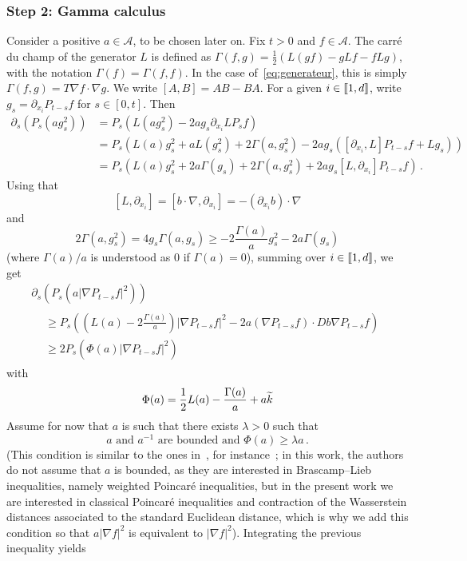 \documentclass[AHL,Unicode,longabstracts,published]{cedram}
\newcommand{\llbracket}{\mathopen{[\mkern -2.7mu[}}
\newcommand{\rrbracket}{\mathclose{]\mkern -2.7mu]}}
\newcommand{\A}{\mathcal A}
\newcommand{\na}{\nabla}
\newcommand{\1}{\mathbbm{1}}
\newcommand{\nv}[1]{#1}
\let\oldtilde\tilde
\renewcommand*{\tilde}[1]{\mathchoice{\widetilde{#1}}{\widetilde{#1}}{\oldtilde{#1}}{\oldtilde{#1}}}
\begin{document}
\subsubsection{Step 2: Gamma calculus}


Consider a positive $a\in\A$, to be chosen later on. Fix $t>0$ and $f\in\A$. The carré du champ of the generator $L$ is defined as $\Gamma(f,g) = \frac12 ( L(gf) - g Lf-fLg)$, with the notation $\Gamma(f)=\Gamma(f,f)$. In the case of~\eqref{eq:generateur}, this is simply $\Gamma(f,g)=T\na f\cdot\na g$. We write $[A,B]=AB-BA$. For a given $i\in\llbracket 1,d\rrbracket$, write $g_s = \partial_{x_i} P_{t-s} f$ for $s\in[0,t]$. Then
\begin{align*}
\partial_s \left( P_s(a g_s^2)\right) &= P_{s} \left( L(ag_s^2) - 2a g_s \partial_{x_i} LP_s f \right) \\
&= P_{s} \left( L(a)g_s^2 + aL(g_s^2) + 2 \Gamma(a,g_s^2)- 2a g_s \left(\left[\partial_{x_i}, L\right] P_{t-s} f + Lg_s\right)\right) \\
&= P_{s} \left( L(a)g_s^2 + 2a\Gamma(g_s) + 2 \Gamma(a,g_s^2)+ 2a g_s [L,\partial_{x_i}] P_{t-s} f\right)\,.
\end{align*}
Using that
\[
\left[L,\partial_{x_i}\right] = \left[b\cdot \na,\partial_{x_i}\right] = -(\partial_{x_i} b) \cdot \na
\]
and
\[
2\Gamma(a,g_s^2) = 4g_s \Gamma(a,g_s) \geqslant -2\frac{\Gamma(a)}{ a} g_s^2 - 2 a \Gamma(g_s)
\]
(where $\Gamma(a)/a$ is understood as $0$ if $\Gamma(a)=0$), summing over $i\in\llbracket 1,d\rrbracket$, we get
\begin{multline*}
\partial_s \left( P_s \left( a \left|\na P_{t-s}f\right|^2\right) \right)\\
\begin{aligned}
&\geqslant P_{s} \left( \left( L(a) - 2\frac{\Gamma(a)}{ a}\right)\left|\na P_{t-s} f\right|^2 - 2a (\na P_{t-s} f) \cdot \nv{D b} \na P_{t-s} f\right) \\
&\geqslant 2 P_{s} \left( \Phi(a) \left|\na P_{t-s} f\right|^2\right)
\end{aligned}
\end{multline*}
with
\[
\Phi(a) = \frac12 L(a) - \frac{\Gamma(a)}{ a} + a \tilde k
\]
Assume for now that $a$ is such that there exists $\lambda>0$ such that
\begin{equation}\label{eq:conditionaBakryEmery}
a \text{ and }a^{-1}\text{ are bounded and } \Phi(a) \geqslant \lambda a \,.
\end{equation}
(This condition is similar to the ones in~\cite{arnaudon2018intertwinings,bonnefont2022note,BonnefontJoulinMa,10.3150/12-BEJ433}, for instance~\cite[Theorem~3.2]{arnaudon2018intertwinings}; in this work, the authors do not assume that $a$ is bounded, as they are interested in Brascamp--Lieb inequalities, namely weighted Poincaré inequalities, but in the present work we are interested in classical Poincaré inequalities and contraction of the Wasserstein distances associated to the standard Euclidean distance, which is why we add this condition so that $a|\na f|^2$ is equivalent to $|\na f|^2$). Integrating the previous inequality yields
\end{document}
